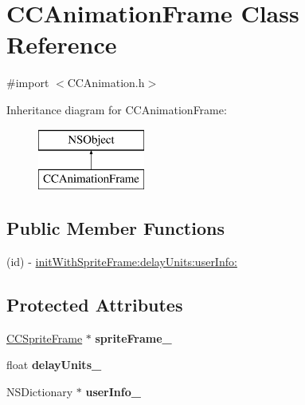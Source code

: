 \hypertarget{interface_c_c_animation_frame}{\section{C\-C\-Animation\-Frame Class Reference}
\label{interface_c_c_animation_frame}
}


{\ttfamily \#import $<$C\-C\-Animation.\-h$>$}

Inheritance diagram for C\-C\-Animation\-Frame\-:\begin{figure}[H]
\begin{center}
\leavevmode
\includegraphics[height=2.000000cm]{interface_c_c_animation_frame}
\end{center}
\end{figure}
\subsection*{Public Member Functions}
\begin{DoxyCompactItemize}
\item 
(id) -\/ \hyperlink{interface_c_c_animation_frame_a7d987b4f51cb75018382a2bb042d7d2d}{init\-With\-Sprite\-Frame\-:delay\-Units\-:user\-Info\-:}
\end{DoxyCompactItemize}
\subsection*{Protected Attributes}
\begin{DoxyCompactItemize}
\item 
\hypertarget{interface_c_c_animation_frame_a1dbdcf878fbfee68fc87f83cd924dc2a}{\hyperlink{interface_c_c_sprite_frame}{C\-C\-Sprite\-Frame} $\ast$ {\bfseries sprite\-Frame\-\_\-}}\label{interface_c_c_animation_frame_a1dbdcf878fbfee68fc87f83cd924dc2a}

\item 
\hypertarget{interface_c_c_animation_frame_a66659ce8832521a9e397e58b4bf82ff7}{float {\bfseries delay\-Units\-\_\-}}\label{interface_c_c_animation_frame_a66659ce8832521a9e397e58b4bf82ff7}

\item 
\hypertarget{interface_c_c_animation_frame_aed50d5526e3770e6918b568692fb29e0}{N\-S\-Dictionary $\ast$ {\bfseries user\-Info\-\_\-}}\label{interface_c_c_animation_frame_aed50d5526e3770e6918b568692fb29e0}

\end{DoxyCompactItemize}
